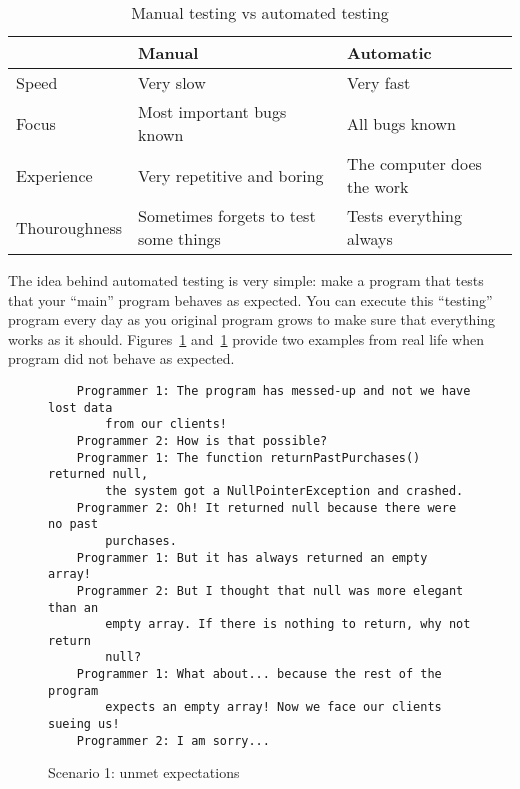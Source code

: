\begin{table}[htbp]
  \centering
  \begin{tabular}{|p{3cm}|p{5cm}|p{5cm}|}
    \hline
    & Manual & Automatic \\
    \hline
    Speed & Very slow & Very fast \\
    Focus & Most important bugs known & All bugs known \\
    Experience & Very repetitive and boring & The computer does the work \\
    Thouroughness & Sometimes forgets to test some things & Tests everything always \\
    \hline
  \end{tabular}
  \caption{Manual testing vs automated testing}
  \label{tab:test}
\end{table}


The idea behind automated testing is very simple: make a program that
tests that your ``main'' program behaves as expected. You can execute
this ``testing'' program every day as you original program grows to
make sure that everything works as it
should. Figures~\ref{fig:sdfsdsers} and~\ref{fig:sdfsdsers} provide
two examples from real life when program did not behave as expected. 

\begin{figure}[tbp]
\begin{verbatim}
    Programmer 1: The program has messed-up and not we have lost data
        from our clients!
    Programmer 2: How is that possible?
    Programmer 1: The function returnPastPurchases() returned null,
        the system got a NullPointerException and crashed. 
    Programmer 2: Oh! It returned null because there were no past
        purchases. 
    Programmer 1: But it has always returned an empty array! 
    Programmer 2: But I thought that null was more elegant than an
        empty array. If there is nothing to return, why not return
        null? 
    Programmer 1: What about... because the rest of the program
        expects an empty array! Now we face our clients sueing us!
    Programmer 2: I am sorry...
\end{verbatim}  
  \caption{Scenario 1: unmet expectations}
  \label{fig:sdfsdsers}
\end{figure}

